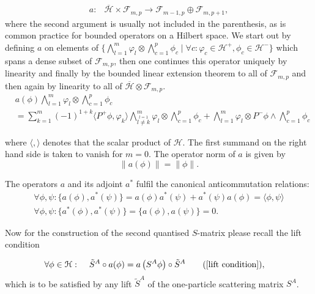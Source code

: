 \documentclass[b5paper,draft,openbib,12pt]{memoir}
\begin{document}
\begin{align}
a: &\overline{\mathcal{H}}\times \mathcal{F}_{m,p} \rightarrow \mathcal{F}_{m-1,p}\oplus \mathcal{F}_{m,p+1},
\end{align}
where the second argument is usually not included in the parenthesis, as is 
common practice for bounded operators on a Hilbert space.
We start out by defining \(a\) on elements of 
\(\{\bigwedge_{l=1}^m \varphi_l \otimes \bigwedge_{c=1}^p \phi_c  \mid \forall c:  \varphi_c \in \mathcal{H}^+, \phi_c \in \mathcal{H}^-   \}\)
which spans a dense subset of \(\mathcal{F}_{m,p}\), then one continues this operator uniquely by 
linearity and finally by the bounded linear extension theorem to all of \(\mathcal{F}_{m,p}\) and then 
again by linearity to all of \(\overline{\mathcal{H}}\otimes \mathcal{F}_{m,p}\).
\begin{align}
&a(\phi)  \bigwedge_{l=1}^m \varphi_l \otimes \bigwedge_{c=1}^p \phi_c\\
&= \sum_{k=1}^m (-1)^{1+k} \langle P^+ \phi, \varphi_k\rangle \bigwedge_{\overset{l=1}{l\neq k}}^m \varphi_l \otimes \bigwedge_{c=1}^p \phi_c + \bigwedge_{l=1}^m \varphi_l \otimes P^- \phi \wedge \bigwedge_{c=1}^p \phi_c
\end{align}

where \(\langle, \rangle\) denotes that the scalar product of 
\(\mathcal{H}\). The first summand on the right hand side is 
taken to vanish for \(m=0\). The operator norm of \(a\) is 
given by 
\begin{equation}
  \|a(\phi)\|=\|\phi\|.
\end{equation}

The operators \(a\) and its adjoint \(a^*\) fulfil the
canonical anticommutation relations:
\begin{align}
  \forall \phi,\psi: \{a(\phi),a^*(\psi)\}=a(\phi)a^*(\psi)+a^*(\psi)a(\phi)=\langle \phi,\psi\rangle\\
  \forall \phi,\psi: \{a^*(\phi),a^*(\psi)\}=\{a(\phi),a(\psi)\}=0.
\end{align}

Now for the construction of the second quantised 
\(S\)-matrix please 
recall the lift condition 

\begin{align}
\forall \phi\in \mathcal{H}:& \hspace{0.5cm} \tilde{S}^A \circ a(\phi)=a\left( S^A \phi \right)  \circ \tilde{S}^A\tag{\ref{lift condition}},
\end{align}
which is to be satisfied by any lift \(\tilde{S}^A\)  
of the one-particle scattering matrix \(S^A\).
\end{document}
